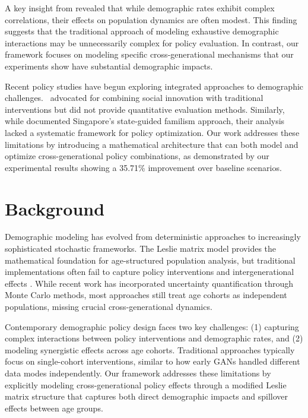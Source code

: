\documentclass{article} %
\begin{document}
A key insight from \citet{Compagnoni2016TheEO} revealed that while demographic rates exhibit complex correlations, their effects on population dynamics are often modest. This finding suggests that the traditional approach of modeling exhaustive demographic interactions may be unnecessarily complex for policy evaluation. In contrast, our framework focuses on modeling specific cross-generational mechanisms that our experiments show have substantial demographic impacts.

Recent policy studies have begun exploring integrated approaches to demographic challenges.\ \citet{Nelles2024PolicyRT} advocated for combining social innovation with traditional interventions but did not provide quantitative evaluation methods. Similarly, while \citet{Zhan2023StateFI} documented Singapore's state-guided familism approach, their analysis lacked a systematic framework for policy optimization. Our work addresses these limitations by introducing a mathematical architecture that can both model and optimize cross-generational policy combinations, as demonstrated by our experimental results showing a 35.71\% improvement over baseline scenarios.

\section{Background}
\label{sec:background}

Demographic modeling has evolved from deterministic approaches to increasingly sophisticated stochastic frameworks. The Leslie matrix model provides the mathematical foundation for age-structured population analysis, but traditional implementations often fail to capture policy interventions and intergenerational effects \citep{Elderd2015QuantifyingDU}. While recent work has incorporated uncertainty quantification through Monte Carlo methods, most approaches still treat age cohorts as independent populations, missing crucial cross-generational dynamics.

Contemporary demographic policy design faces two key challenges: (1) capturing complex interactions between policy interventions and demographic rates, and (2) modeling synergistic effects across age cohorts. Traditional approaches typically focus on single-cohort interventions, similar to how early GANs \citep{gan} handled different data modes independently. Our framework addresses these limitations by explicitly modeling cross-generational policy effects through a modified Leslie matrix structure that captures both direct demographic impacts and spillover effects between age groups.
\end{document}
